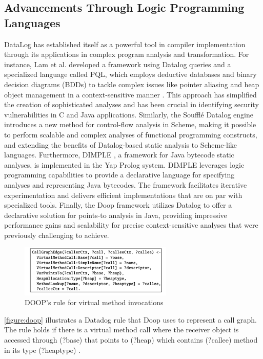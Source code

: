 \subsection{Advancements Through Logic Programming Languages}
DataLog has established itself as a powerful tool in compiler implementation through its applications in complex program analysis and transformation. For instance, Lam et al. developed a framework using Datalog queries and a specialized language called PQL, which employs deductive databases and binary decision diagrams (BDDs) to tackle complex issues like pointer aliasing and heap object management in a context-sensitive manner \cite{Lam2005}. This approach has simplified the creation of sophisticated analyses and has been crucial in identifying security vulnerabilities in C and Java applications. Similarly, the Soufflé Datalog engine \cite{silverman2021wantanalyzeschemeprograms} introduces a new method for control-flow analysis in Scheme, making it possible to perform scalable and complex analyses of functional programming constructs, and extending the benefits of Datalog-based static analysis to Scheme-like languages. Furthermore, DIMPLE \cite{Benton2007}, a framework for Java bytecode static analyses, is implemented in the Yap Prolog system. DIMPLE leverages logic programming capabilities to provide a declarative language for specifying analyses and representing Java bytecodes. The framework facilitates iterative experimentation and delivers efficient implementations that are on par with specialized tools. Finally, the Doop framework \cite{Bravenboer2009} utilizes Datalog to offer a declarative solution for points-to analysis in Java, providing impressive performance gains and scalability for precise context-sensitive analyses that were previously challenging to achieve. 
\newpage
\begin{figure}[h]
    \centering
    \includegraphics[width=0.65\textwidth]{Packages/Doop.png}
    \caption{DOOP's rule for virtual method invocations \cite{Bravenboer2009}}
    \label{figure:doop}
\end{figure}
\autoref{figure:doop} illustrates a Datadog rule that Doop uses to represent a call graph. The rule holds if there is a virtual method call where the receiver object is accessed through (?base) that points to (?heap) which contains (?callee) method in its type (?heaptype) \cite{Bravenboer2009}.

